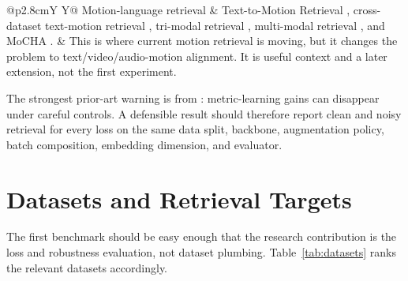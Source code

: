 \documentclass[11pt]{article}
\begin{document}
\begin{table}[htbp]
\begin{tabularx}{\textwidth}{@{}p{2.8cm}Y Y@{}}
Motion-language retrieval & Text-to-Motion Retrieval \citep{petrovich2023textmotion}, cross-dataset text-motion retrieval \citep{bensabath2024crossdataset}, tri-modal retrieval \citep{yin2024trimodal}, multi-modal retrieval \citep{yu2025multimodal}, and MoCHA \citep{warner2026mocha}. & This is where current motion retrieval is moving, but it changes the problem to text/video/audio-motion alignment. It is useful context and a later extension, not the first experiment. \\
\bottomrule
\end{tabularx}
\end{table}

The strongest prior-art warning is from \citet{musgrave2020metric}: metric-learning gains can disappear under careful controls. A defensible result should therefore report clean and noisy retrieval for every loss on the same data split, backbone, augmentation policy, batch composition, embedding dimension, and evaluator.

\section{Datasets and Retrieval Targets}

The first benchmark should be easy enough that the research contribution is the loss and robustness evaluation, not dataset plumbing. Table~\ref{tab:datasets} ranks the relevant datasets accordingly.
\end{document}
